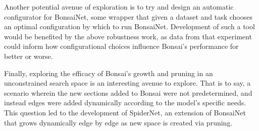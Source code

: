 Another potential avenue of exploration is to try and design an automatic configurator for BonsaiNet, some wrapper that
given a dataset and task chooses an optimal configuration by which to run BonsaiNet. Development of such a tool would
be benefited by the above robustness work, as data from that experiment could inform how configurational choices influence
Bonsai's performance for better or worse.

Finally, exploring the efficacy of Bonsai's growth and pruning in an unconstrained search space is an
interesting avenue to explore. That is to say, a scenario wherein the new sections added to Bonsai were not predetermined, and instead
edges were added dynamically according to the model's specific needs. This question led to the development of SpiderNet,
an extension of BonsaiNet that grows dynamically edge by edge as new space is created via pruning.

